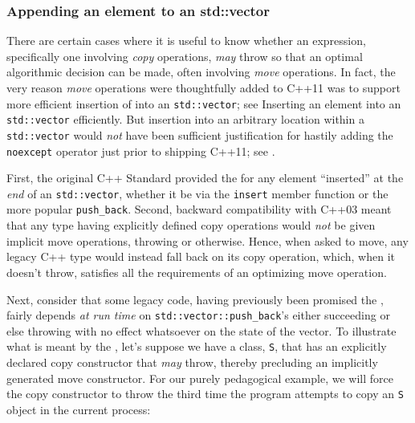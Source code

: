 \subsubsection[Appending an element to an \lstinline!std::vector!]{Appending an element to an {\SubsubsecCode std::vector}}\label{appending-an-element-to-an-std::vector}

There are certain cases where it is useful to know whether an
expression, specifically one involving \emph{copy} operations,
\emph{may} throw so that an optimal algorithmic decision can be made,
often involving \emph{move} operations. In fact, the very reason
\emph{move} operations were thoughtfully added to C++11 was to support
more efficient insertion of  into an
\lstinline!std::vector!; see {Inserting an element into an
\texttt{std::vector} efficiently}. But insertion into an arbitrary
location within a \lstinline!std::vector! would \emph{not} have been
sufficient justification for hastily adding the \lstinline!noexcept!
operator just prior to shipping C++11; see .

First, the original C++ Standard provided the  for any element ``inserted'' at the
\emph{end} of an \lstinline!std::vector!, whether it be via the
\lstinline!insert! member function or the more popular \lstinline!push_back!.
Second, backward compatibility with C++03 meant that any type having
explicitly defined copy operations would \emph{not} be given implicit
move operations, throwing or otherwise. Hence, when asked to move, any
legacy C++ type would instead fall back on its copy operation, which,
when it doesn't throw, satisfies all the requirements of an optimizing
move operation.

Next, consider that some legacy code, having previously been promised
the , fairly depends \emph{at run time} on
\lstinline!std::vector::push_back!'s either succeeding or else throwing
with no effect whatsoever on the state of the vector. To illustrate what
is meant by the , let's
suppose we have a class, \lstinline!S!, that has an explicitly declared
copy constructor that \emph{may} throw, thereby precluding an implicitly
generated move constructor. For our purely pedagogical example, we will
force the copy constructor to throw the third time the program attempts
to copy an \lstinline!S! object in the current process:

